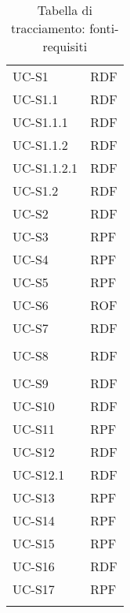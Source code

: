\begin{longtable}{| p{5cm} | p{5cm} |}
		UC-S1 & RDF \\
		\rowcolor{LightGray}
		UC-S1.1 & RDF\\
		UC-S1.1.1 & RDF\\
		\rowcolor{LightGray}
		UC-S1.1.2 & RDF\\
		UC-S1.1.2.1 & RDF\\
		UC-S1.2 & RDF\\
		UC-S2 & RDF\\
		\rowcolor{LightGray}
		UC-S3 & RPF\\
		UC-S4 & RPF\\
		\rowcolor{LightGray}
		UC-S5 & RPF \\
		UC-S6 & ROF \\
		UC-S7 & RDF \\\\
		UC-S8 & RDF \\\\
		UC-S9 & RDF \\
		UC-S10 & RDF\\
		\rowcolor{LightGray}
		UC-S11 & RPF \\
		UC-S12 & RDF \\
		UC-S12.1 & RDF \\
		UC-S13 & RPF \\
		\rowcolor{LightGray}
		UC-S14 & RPF \\
		UC-S15 & RPF \\ 
		UC-S16 & RDF\\
		UC-S17 & RPF\\
		
		\hline
		\caption{Tabella di tracciamento: fonti-requisiti}
\end{longtable}
\newpage
